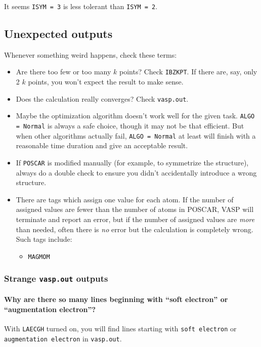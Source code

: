 \documentclass[hyperref, a4paper]{article}
\begin{document}
It seems \texttt{ISYM = 3} is less tolerant than \texttt{ISYM = 2}.

\subsection{Unexpected outputs}

Whenever something weird happens, check these terms:
\begin{itemize}
    \item Are there too few or too many $k$ points? Check \texttt{IBZKPT}. If there are, say, only 2 $k$ points, you won't expect the result to make sense.
    \item Does the calculation really converges? Check \texttt{vasp.out}. 
    \item Maybe the optimization algorithm doesn't work well for the given task. \texttt{ALGO = Normal} is always a safe choice, though it may not be that efficient. But when other algorithms actually fail, \texttt{ALGO = Normal} at least will finish with a reasonable time duration and give an acceptable result.
    \item If \texttt{POSCAR} is modified manually (for example, to symmetrize the structure), always do a double check to ensure you didn't accidentally introduce a wrong structure.
    \item There are tags which assign one value for each atom. If the number of assigned values are fewer than the number of atoms in POSCAR, VASP will terminate and report an error, but if the number of assigned values are \emph{more} than needed, often there is \emph{no} error but the calculation is completely wrong.
    Such tags include:
    \begin{itemize}
        \item \texttt{MAGMOM}
    \end{itemize}
\end{itemize}

\subsubsection{Strange \texttt{vasp.out} outputs}

\paragraph{Why are there so many lines beginning with ``soft electron'' or ``augmentation electron''?}

With \texttt{LAECGH} turned on, you will find lines starting with \texttt{soft electron} or \texttt{augmentation electron} in \texttt{vasp.out}.
\end{document}
